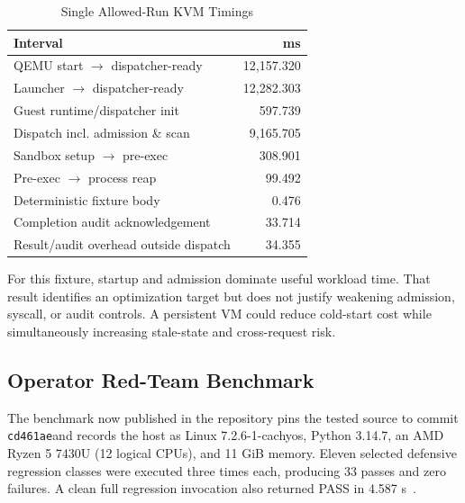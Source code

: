 \documentclass[journal]{IEEEtran}
\newcommand{\benchshort}{\texttt{cd461ae}}
\begin{document}
\begin{table}[!t]
\caption{Single Allowed-Run KVM Timings}
\label{tab:kvm_timing}
\centering
\small
\begin{tabular}{lr}
\toprule
\textbf{Interval} & \textbf{ms} \\
\midrule
QEMU start $\rightarrow$ dispatcher-ready & 12{,}157.320 \\
Launcher $\rightarrow$ dispatcher-ready & 12{,}282.303 \\
Guest runtime/dispatcher init & 597.739 \\
Dispatch incl. admission \& scan & 9{,}165.705 \\
Sandbox setup $\rightarrow$ pre-exec & 308.901 \\
Pre-exec $\rightarrow$ process reap & 99.492 \\
Deterministic fixture body & 0.476 \\
Completion audit acknowledgement & 33.714 \\
Result/audit overhead outside dispatch & 34.355 \\
\bottomrule
\end{tabular}
\end{table}

For this fixture, startup and admission dominate useful workload time. That result identifies an optimization target but does not justify weakening admission, syscall, or audit controls. A persistent VM could reduce cold-start cost while simultaneously increasing stale-state and cross-request risk.

\subsection{Operator Red-Team Benchmark}
The benchmark now published in the repository pins the tested source to commit \benchshort and records the host as Linux 7.2.6-1-cachyos, Python 3.14.7, an AMD Ryzen 5 7430U (12 logical CPUs), and 11 GiB memory. Eleven selected defensive regression classes were executed three times each, producing 33 passes and zero failures. A clean full regression invocation also returned PASS in 4.587 s~\cite{BULL_Benchmark,BULL_BenchmarkJSON}.
\end{document}
